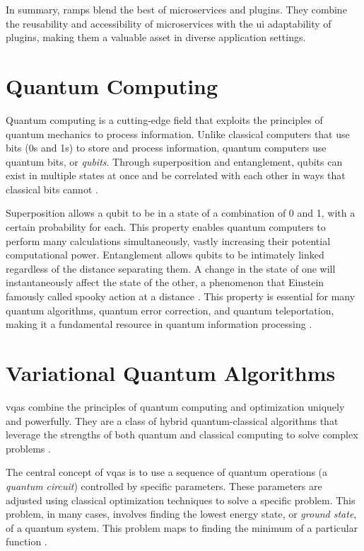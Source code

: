 \documentclass[
  a4paper,  %
  twoside,  %
  bibliography=totoc,
  headsepline,
  cleardoublepage=empty,
  parskip=half,
  draft=false
]{scrbook}
\begin{document}
In summary, \glspl{ramp} blend the best of microservices and plugins.
They combine the reusability and accessibility of microservices with the \gls{ui} adaptability of plugins, making them a valuable asset in diverse application settings.


\section{Quantum Computing}
\label{sec:quantumComputing}
Quantum computing is a cutting-edge field that exploits the principles of quantum mechanics to process information.
Unlike classical computers that use bits (0s and 1s) to store and process information, quantum computers use quantum bits, or \emph{qubits}.
Through superposition and entanglement, qubits can exist in multiple states at once and be correlated with each other in ways that classical bits cannot \cite{Nielsen2010}.

Superposition allows a qubit to be in a state of a combination of 0 and 1, with a certain probability for each.
This property enables quantum computers to perform many calculations simultaneously, vastly increasing their potential computational power.
Entanglement allows qubits to be intimately linked regardless of the distance separating them.
A change in the state of one will instantaneously affect the state of the other, a phenomenon that Einstein famously called spooky action at a distance \cite{Einstein1935}.
This property is essential for many quantum algorithms, quantum error correction, and quantum teleportation, making it a fundamental resource in quantum information processing \cite{Nielsen2010, Preskill1998}.


\section{Variational Quantum Algorithms}
\label{sec:variationalQuantumAlgorithms}

\glspl{vqa} combine the principles of quantum computing and optimization uniquely and powerfully.
They are a class of hybrid quantum-classical algorithms that leverage the strengths of both quantum and classical computing to solve complex problems \cite{McClean2016}.

The central concept of \glspl{vqa} is to use a sequence of quantum operations (a \emph{quantum circuit}) controlled by specific parameters.
These parameters are adjusted using classical optimization techniques to solve a specific problem.
This problem, in many cases, involves finding the lowest energy state, or \emph{ground state}, of a quantum system.
This problem maps to finding the minimum of a particular function \cite{Peruzzo2013}.
\end{document}
